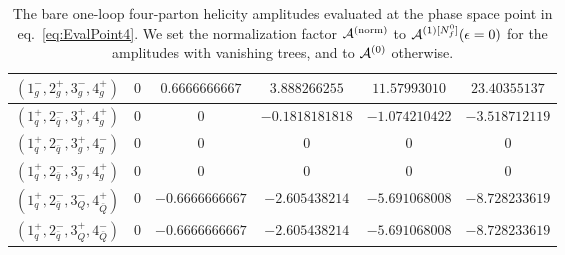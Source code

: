 \begin{table}[h]
\begin{adjustbox}{width=1\textwidth}
\begin{tabular}{cccccc}
      $(1_g^-,2_g^+,3_g^-,4_g^+)$ & $0$ & $0.6666666667$ &
      $3.888266255$ & $11.57993010$ & $23.40355137$ \\
      \midrule
      $(1_q^+,2_{\bar q}^-,3_g^+,4_g^+)$ & $0$ & $0$ &
      $-0.1818181818$ & $-1.074210422$ & $-3.518712119$ \\
      $(1_q^+,2_{\bar q}^-,3_g^+,4_g^-)$ & $0$ & $0$ & $0$ & $0$ & $0$ \\
      $(1_q^+,2_{\bar q}^-,3_g^-,4_g^+)$ & $0$ & $0$ & $0$ & $0$ & $0$ \\
      \midrule
      $(1_q^+,2_{\bar q}^-,3_Q^-,4_{\bar Q}^+)$ & $0$ &
      $-0.6666666667$ & $-2.605438214$ & $-5.691068008$ &
      $-8.728233619$ \\
      $(1_q^+,2_{\bar q}^-,3_Q^+,4_{\bar Q}^-)$ & $0$ &
      $-0.6666666667$ & $-2.605438214$ & $-5.691068008$ &
      $-8.728233619$ \\
      \bottomrule
    \end{tabular}
  \end{adjustbox}
\caption{The bare one-loop four-parton helicity amplitudes 
  evaluated at the phase space point in 
  eq.~\eqref{eq:EvalPoint4}. We set the
    normalization factor $\mathcal{A}^\mathrm{(norm)}$ to $\mathcal{A}^{(1)[N_f^0]}(\epsilon=0)$ for the
    amplitudes with vanishing trees, and to $\mathcal{A}^{(0)}$ otherwise.}
  \label{tab:results4parton1L}
\end{table}

